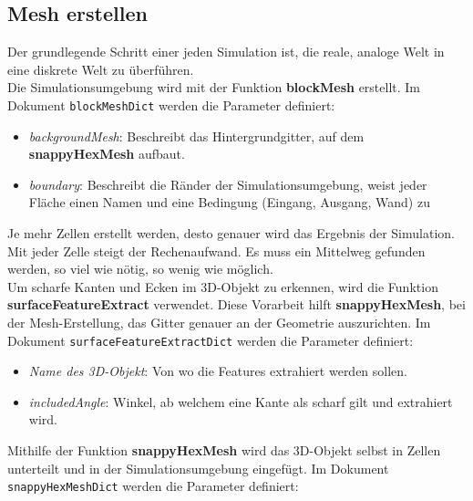 \subsection{Mesh erstellen \label{openfoam:section:Mesh erstellen}}
Der grundlegende Schritt einer jeden Simulation ist, die reale, analoge Welt in eine diskrete Welt zu überführen.\\
Die Simulationsumgebung wird mit der Funktion \textbf{blockMesh} erstellt.
Im Dokument \texttt{blockMeshDict} werden die Parameter definiert:

\begin{itemize}
    \item \textit{backgroundMesh}: Beschreibt das Hintergrundgitter, auf dem \textbf{snappyHexMesh} aufbaut.
    \item \textit{boundary}: Beschreibt die Ränder der Simulationsumgebung, weist jeder Fläche einen Namen und eine Bedingung (Eingang, Ausgang, Wand) zu
\end{itemize}

Je mehr Zellen erstellt werden, desto genauer wird das Ergebnis der Simulation.
Mit jeder Zelle steigt der Rechenaufwand.
Es muss ein Mittelweg gefunden werden, so viel wie nötig, so wenig wie möglich.\\

Um scharfe Kanten und Ecken im 3D-Objekt zu erkennen, wird die Funktion \textbf{surfaceFeatureExtract} verwendet.
Diese Vorarbeit hilft \textbf{snappyHexMesh}, bei der Mesh-Erstellung, das Gitter genauer an der Geometrie auszurichten.
Im Dokument \texttt{surfaceFeatureExtractDict} werden die Parameter definiert:

\begin{itemize}
    \item \textit{Name des 3D-Objekt}: Von wo die Features extrahiert werden sollen.
    \item \textit{includedAngle}: Winkel, ab welchem eine Kante als scharf gilt und extrahiert wird.
\end{itemize}

Mithilfe der Funktion \textbf{snappyHexMesh} wird das 3D-Objekt selbst in  Zellen unterteilt und in der Simulationsumgebung eingefügt. 
Im Dokument \texttt{snappyHexMeshDict} werden die Parameter definiert:

